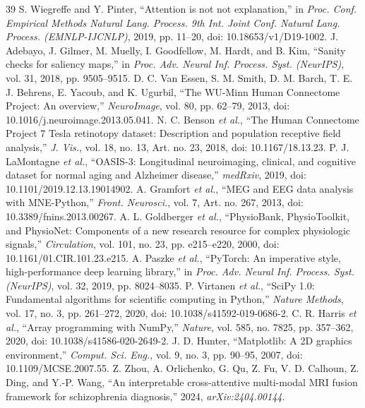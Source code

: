 \begin{thebibliography}{39}
S. Wiegreffe and Y. Pinter, ``Attention is not not explanation,'' in \emph{Proc. Conf. Empirical Methods Natural Lang. Process. 9th Int. Joint Conf. Natural Lang. Process. (EMNLP-IJCNLP)}, 2019, pp. 11--20, doi: 10.18653/v1/D19-1002.
J. Adebayo, J. Gilmer, M. Muelly, I. Goodfellow, M. Hardt, and B. Kim, ``Sanity checks for saliency maps,'' in \emph{Proc. Adv. Neural Inf. Process. Syst. (NeurIPS)}, vol. 31, 2018, pp. 9505--9515.
D. C. Van Essen, S. M. Smith, D. M. Barch, T. E. J. Behrens, E. Yacoub, and K. Ugurbil, ``The WU-Minn Human Connectome Project: An overview,'' \emph{NeuroImage}, vol. 80, pp. 62--79, 2013, doi: 10.1016/j.neuroimage.2013.05.041.
N. C. Benson \emph{et al.}, ``The Human Connectome Project 7 Tesla retinotopy dataset: Description and population receptive field analysis,'' \emph{J. Vis.}, vol. 18, no. 13, Art. no. 23, 2018, doi: 10.1167/18.13.23.
P. J. LaMontagne \emph{et al.}, ``OASIS-3: Longitudinal neuroimaging, clinical, and cognitive dataset for normal aging and Alzheimer disease,'' \emph{medRxiv}, 2019, doi: 10.1101/2019.12.13.19014902.
A. Gramfort \emph{et al.}, ``MEG and EEG data analysis with MNE-Python,'' \emph{Front. Neurosci.}, vol. 7, Art. no. 267, 2013, doi: 10.3389/fnins.2013.00267.
A. L. Goldberger \emph{et al.}, ``PhysioBank, PhysioToolkit, and PhysioNet: Components of a new research resource for complex physiologic signals,'' \emph{Circulation}, vol. 101, no. 23, pp. e215--e220, 2000, doi: 10.1161/01.CIR.101.23.e215.
A. Paszke \emph{et al.}, ``PyTorch: An imperative style, high-performance deep learning library,'' in \emph{Proc. Adv. Neural Inf. Process. Syst. (NeurIPS)}, vol. 32, 2019, pp. 8024--8035.
P. Virtanen \emph{et al.}, ``SciPy 1.0: Fundamental algorithms for scientific computing in Python,'' \emph{Nature Methods}, vol. 17, no. 3, pp. 261--272, 2020, doi: 10.1038/s41592-019-0686-2.
C. R. Harris \emph{et al.}, ``Array programming with NumPy,'' \emph{Nature}, vol. 585, no. 7825, pp. 357--362, 2020, doi: 10.1038/s41586-020-2649-2.
J. D. Hunter, ``Matplotlib: A 2D graphics environment,'' \emph{Comput. Sci. Eng.}, vol. 9, no. 3, pp. 90--95, 2007, doi: 10.1109/MCSE.2007.55.
Z. Zhou, A. Orlichenko, G. Qu, Z. Fu, V. D. Calhoun, Z. Ding, and Y.-P. Wang, ``An interpretable cross-attentive multi-modal MRI fusion framework for schizophrenia diagnosis,'' 2024, \emph{arXiv:2404.00144}.

\end{thebibliography}
